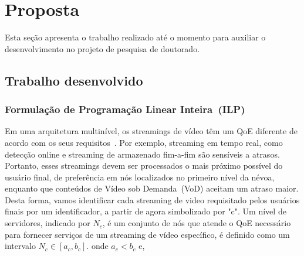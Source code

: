 \clearpage
\section{Proposta}
\label{ch:developed}

Esta seção apresenta o trabalho realizado até o momento para auxiliar o desenvolvimento 
no projeto de pesquisa de doutorado. 



%


\subsection{Trabalho desenvolvido}
\label{subsec:applications}


\subsubsection{Formulação de Programação Linear Inteira~(ILP)}
\label{subsec:applications}

Em uma arquitetura multinível, os streamings de vídeo têm um QoE diferente de acordo com os seus requisitos~\cite{judyLATINCOM2017}. Por exemplo, streaming em tempo real, como detecção online e streaming de armazenado fim-a-fim são sensíveis a atrasos. Portanto, esses streamings devem ser processados o mais próximo possível do usuário final, de preferência em nós localizados no primeiro nível da névoa, enquanto que conteúdos de Vídeo sob Demanda~(VoD) aceitam um atraso maior. Desta forma, vamos identificar cada streaming de video requisitado pelos usuários finais por um identificador, a partir de agora simbolizado por "c".
Um nível de servidores, indicado por $N_{c}$, é um conjunto de nós que atende o QoE necessário para fornecer serviços de um streaming de vídeo específico, é definido como um intervalo $N_{c} \in [a_{c}, b_{c}]$. onde $a_{c} < b_{c}$ e,

